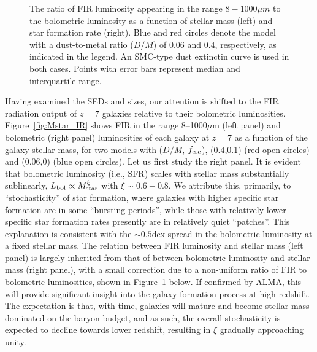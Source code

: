 \begin{figure}[!hb]
\centering
\vskip -0.5cm
\hskip -1cm
\hskip -0cm
\vskip -0cm
\caption{%
The ratio of FIR luminosity appearing in the range $8-1000\mu m$ to the bolometric luminosity
as a function of stellar mass (left) and star formation rate (right). Blue and red circles denote the model
   with a dust-to-metal ratio ($D/M$) of 0.06 and 0.4, respectively, as indicated in the legend.
   An SMC-type dust extinctin curve is used in both cases. Points with error bars represent median
   and interquartile range.
}
\label{fig:rat}
\end{figure}





Having examined the SEDs and sizes, our attention is shifted to
the FIR radiation output of $z=7$ galaxies relative to their bolometric luminosities.
Figure~\ref{fig:Mstar_IR}
shows FIR in the range 8--1000$\mu$m (left panel) and bolometric (right panel) luminosities 
of each galaxy at $z=7$ 
as a function of the galaxy stellar mass,
for two models with ($D/M$, $f_{\rm esc}$), (0.4,0.1) (red open circles) and (0.06,0) (blue open circles).
Let us first study the right panel.
It is evident that bolometric luminosity (i.e., SFR) scales with stellar mass substantially sublinearly,
$L_{\rm bol}\propto M_{\rm star}^\xi$ with $\xi\sim 0.6-0.8$.
We attribute this, primarily, to ``stochasticity'' of star formation, where galaxies with higher specific star formation 
are in some ``bursting periods'', while those with relatively lower specific star formation rates presently 
are in relatively quiet ``patches''.
This explanation is consistent with the $\sim 0.5$dex spread in the bolometric luminosity at a fixed stellar mass.
The relation between FIR luminosity and stellar mass (left panel) is largely inherited from that of 
between bolometric luminosity and stellar mass (right panel),
with a small correction due to a non-uniform ratio of FIR to bolometric luminosities, shown in Figure~\ref{fig:rat} below.
If confirmed by ALMA, this will provide significant insight into the galaxy formation process at high redshift.
The expectation is that, with time, galaxies 
will mature and become stellar mass dominated on the baryon budget, and as such, the overall stochasticity 
is expected to decline towards lower redshift, resulting in $\xi$ gradually approaching unity.





